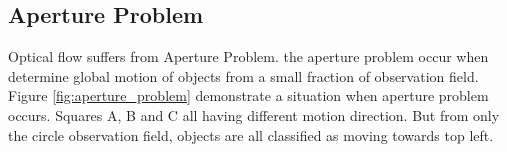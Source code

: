 \subsection{Aperture Problem}

Optical flow suffers from Aperture Problem. the aperture problem occur when determine global motion of objects from a small fraction of observation field. Figure \ref{fig:aperture_problem} demonstrate a situation when aperture problem occurs. Squares A, B and C all having different motion direction. But from only the circle observation field, objects are all classified as moving towards top left.




